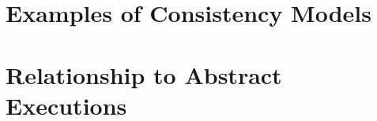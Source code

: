 \documentclass[a4paper,UKenglish]{article}%
\theoremstyle{plain}
\begin{document}
%
%
%
%
%

\section{Examples of Consistency Models}

%
%

\section{Relationship to Abstract Executions}

\end{document}
